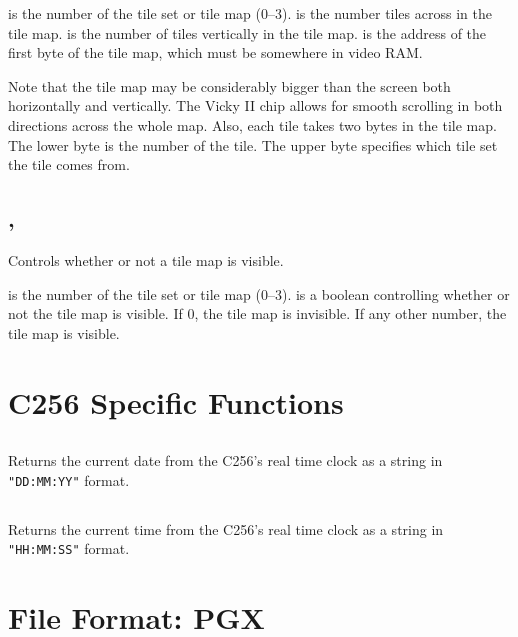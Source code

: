 \documentclass{report}
\begin{document}
     is the number of the tile set or tile map (0--3).
     is the number tiles across in the tile map.
     is the number of tiles vertically in the tile map.
     is the address of the first byte of the tile map, which must be somewhere
    in video RAM.

    Note that the tile map may be considerably bigger than the screen both horizontally and vertically.
    The Vicky II chip allows for smooth scrolling in both directions across the whole map.
    Also, each tile takes two bytes in the tile map. The lower byte is the number of the tile. The upper
    byte specifies which tile set the tile comes from.

    \subsection*{ , }

    Controls whether or not a tile map is visible.

     is the number of the tile set or tile map (0--3).
     is a boolean controlling whether or not the tile map is visible.
    If 0, the tile map is invisible. If any other number, the tile map is visible.

    \section*{C256 Specific Functions}

    \subsection*{}

    Returns the current date from the C256's real time clock as a string
    in \verb+"DD:MM:YY"+ format.

    \subsection*{}

    Returns the current time from the C256's real time clock as a string
    in \verb+"HH:MM:SS"+ format.   
    
    \section*{File Format: PGX}
\end{document}
